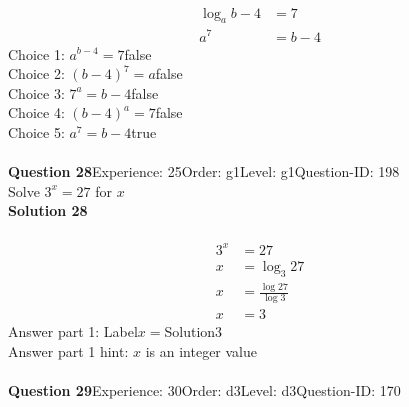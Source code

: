 \documentclass{article}
\begin{document}
\\[-35pt]\begin{align*}
\log_{a}b-4&=7\\[2pt]
a^7&=b-4
\end{align*}
Choice 1: \hspace{20pt}$a^{b-4}=7$\hspace{20pt}false\\
Choice 2: \hspace{20pt}$(b-4)^7=a$\hspace{20pt}false\\
Choice 3: \hspace{20pt}$7^a=b-4$\hspace{20pt}false\\
Choice 4: \hspace{20pt}$(b-4)^a=7$\hspace{20pt}false\\
Choice 5: \hspace{20pt}$a^7=b-4$\hspace{20pt}true\\
\\[4pt]
\noindent\textbf{Question 28}\hspace{20pt}Experience: 25\hspace{20pt}Order: g1\hspace{20pt}Level: g1\hspace{20pt}Question-ID: 198\\[2pt]
Solve $3^x=27$ for $x$\\[4pt]
\noindent\textbf{Solution 28}\\[2pt]
\\[-35pt]\begin{align*}
3^x&=27\\[2pt]
x&=\log_{3}27\\[2pt]
x&=\displaystyle\frac{\log27}{\log3}\\[2pt]
x&=3
\end{align*}
Answer part 1: \hspace{10pt}Label\hspace{10pt}$x=$\hspace{10pt}Solution\hspace{10pt}3\\
Answer part 1 hint: \hspace{15pt}$x$ is an integer value\\
\\[4pt]
\noindent\textbf{Question 29}\hspace{20pt}Experience: 30\hspace{20pt}Order: d3\hspace{20pt}Level: d3\hspace{20pt}Question-ID: 170\\[2pt]
\end{document}
